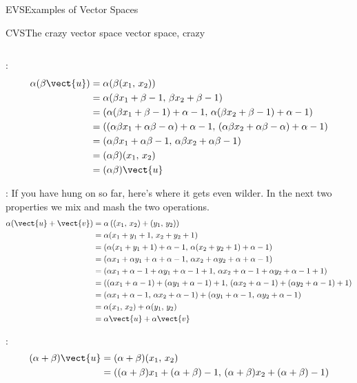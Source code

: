 \begin{subsect}{EVS}{Examples of Vector Spaces}
\begin{example}{CVS}{The crazy vector space }{vector space, crazy}
\begin{para}
\begin{equation*}
\end{equation*}
\end{para}
%
\begin{para}:
%
\begin{align*}
\alpha(\beta\vect{u})
&=\alpha(\beta(x_1,\,x_2))\\
&=\alpha(\beta x_1+\beta-1,\,\beta x_2+\beta-1)\\
&=(\alpha(\beta x_1+\beta-1)+\alpha-1,\,\alpha(\beta x_2+\beta-1)+\alpha-1)\\
&=((\alpha\beta x_1+\alpha\beta-\alpha)+\alpha-1,\,(\alpha\beta x_2+\alpha\beta-\alpha)+\alpha-1)\\
&=(\alpha\beta x_1+\alpha\beta-1,\,\alpha\beta x_2+\alpha\beta-1)\\
&=(\alpha\beta)(x_1,\,x_2)\\
&=(\alpha\beta)\vect{u}
\end{align*}\end{para}
%
\begin{para}:  If you have hung on so far, here's where it gets even wilder.  In the next two properties we mix and mash the two operations.
%
\begin{align*}
\alpha(\vect{u}+\vect{v})&=\alpha\left((x_1,\,x_2)+(y_1,\,y_2)\right)\\
&=\alpha(x_1+y_1+1,\,x_2+y_2+1)\\
&=(\alpha(x_1+y_1+1)+\alpha-1,\,\alpha(x_2+y_2+1)+\alpha-1)\\
&=(\alpha x_1+\alpha y_1+\alpha+\alpha-1,\,\alpha x_2+\alpha y_2+\alpha+\alpha-1)\\
&=(\alpha x_1+\alpha-1+\alpha y_1+\alpha-1+1,\,\alpha x_2+\alpha-1+\alpha y_2+\alpha-1+1)\\
&=((\alpha x_1+\alpha-1)+(\alpha y_1+\alpha-1)+1,\,(\alpha x_2+\alpha-1)+(\alpha y_2+\alpha-1)+1)\\
&=(\alpha x_1+\alpha-1,\,\alpha x_2+\alpha-1)+(\alpha y_1+\alpha-1,\,\alpha y_2+\alpha-1)\\
&=\alpha(x_1,\,x_2)+\alpha(y_1,\,y_2)\\
&=\alpha\vect{u}+\alpha\vect{v}
\end{align*}
\end{para}
%
\begin{para}:
%
\begin{align*}
(\alpha+\beta)\vect{u}&=(\alpha+\beta)(x_1,\,x_2)\\
&=((\alpha+\beta)x_1+(\alpha+\beta)-1,\,(\alpha+\beta)x_2+(\alpha+\beta)-1)\\

\end{align*}
\end{para}
\end{example}
\end{subsect}
